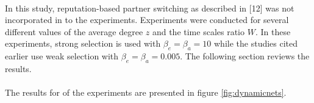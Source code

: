 \documentclass{article}
\begin{document}
	\paragraph{}In this study, reputation-based partner switching as described in [12] was not incorporated in to the experiments.  Experiments were conducted for several different values of the average degree $z$ and the time scales ratio $W$.  In these experiments, strong selection is used with $\beta_e=\beta_a=10$ while the studies cited earlier use weak selection with $\beta_e=\beta_a=0.005$.  The following section reviews the results.
	\paragraph{} The results for of the experiments are presented in figure \ref{fig:dynamicnets}.
\end{document}
